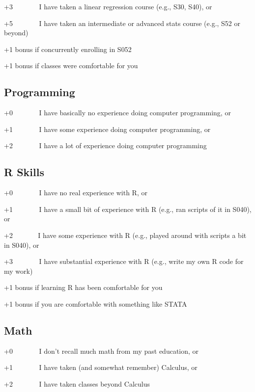 \documentclass[
  letterpaper,
  DIV=11,
  numbers=noendperiod]{scrreprt}
\begin{document}
+3~~~~~~~ I have taken a linear regression course (e.g., S30, S40), or

+5~~~~~~~ I have taken an intermediate or advanced stats course (e.g.,
S52 or beyond)

+1 bonus if concurrently enrolling in S052

+1 bonus if classes were comfortable for you

\subsection*{\texorpdfstring{\textbf{Programming}}{Programming}}\label{programming}

+0~~~~~~~ I have basically no experience doing computer programming, or

+1~~~~~~~ I have some experience doing computer programming, or

+2~~~~~~~ I have a lot of experience doing computer programming

\subsection*{\texorpdfstring{\textbf{R
Skills}}{R Skills}}\label{r-skills}

+0~~~~~~~ I have no real experience with R, or

+1~~~~~~~ I have a small bit of experience with R (e.g., ran scripts of
it in S040), or

+2 ~~~~~~ I have some experience with R (e.g., played around with
scripts a bit in S040), or

+3~~~~~~~ I have substantial experience with R (e.g., write my own R
code for my work)

+1 bonus if learning R has been comfortable for you

+1 bonus if you are comfortable with something like STATA

\subsection*{\texorpdfstring{\textbf{Math}}{Math}}\label{math}

+0~~~~~~~ I don't recall much math from my past education, or

+1~~~~~~~ I have taken (and somewhat remember) Calculus, or

+2~~~~~~~ I have taken classes beyond Calculus
\end{document}
